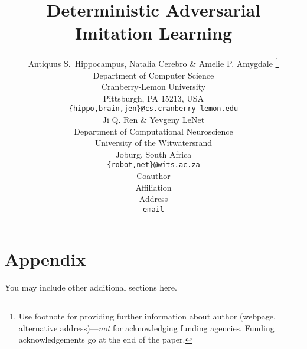 \documentclass{article} %
\title{Deterministic Adversarial Imitation Learning}
\author{Antiquus S.~Hippocampus, Natalia Cerebro \& Amelie P. Amygdale \thanks{ Use footnote for providing further information
about author (webpage, alternative address)---\emph{not} for acknowledging
funding agencies.  Funding acknowledgements go at the end of the paper.} \\
Department of Computer Science\\
Cranberry-Lemon University\\
Pittsburgh, PA 15213, USA \\
\texttt{\{hippo,brain,jen\}@cs.cranberry-lemon.edu} \\
\And
Ji Q. Ren \& Yevgeny LeNet \\
Department of Computational Neuroscience \\
University of the Witwatersrand \\
Joburg, South Africa \\
\texttt{\{robot,net\}@wits.ac.za} \\
\AND
Coauthor \\
Affiliation \\
Address \\
\texttt{email}
}
\begin{document}
\maketitle













\appendix
\section{Appendix}
You may include other additional sections here.
\end{document}
